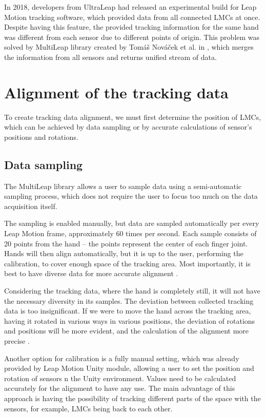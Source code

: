 
In 2018, developers from UltraLeap had released an experimental build for Leap Motion tracking software, which provided data from all connected LMCs at once. Despite having this feature, the provided tracking information for the same hand was different from each sensor due to different points of origin. This problem was solved by MultiLeap library created by Tomáš Nováček et al. in \cite{tomasMultileap}, which merges the information from all sensors and returns unified stream of data. 

\section{Alignment of the tracking data}

To create tracking data alignment, we must first determine the position of LMCs, which can be achieved by data sampling or by accurate calculations of sensor's positions and rotations.

\subsection{Data sampling}

The MultiLeap library allows a user to sample data using a semi-automatic sampling process, which does not require the user to focus too much on the data acquisition itself.

The sampling is enabled manually, but data are sampled automatically per every Leap Motion frame, approximately 60 times per second. Each sample consists of 20 points from the hand – the points represent the center of each finger joint. Hands will then align automatically, but it is up to the user, performing the calibration, to cover enough space of the tracking area. Most importantly, it is best to have diverse data for more accurate alignment \cite{tomasMultileap}.

Considering the tracking data, where the hand is completely still, it will not have the necessary diversity in its samples. The deviation between collected tracking data is too insignificant. If we were to move the hand across the tracking area, having it rotated in various ways in various positions, the deviation of rotations and positions will be more evident, and the calculation of the alignment more precise \cite{tomasMultileap}.

Another option for calibration is a fully manual setting, which was already provided by Leap Motion Unity module, allowing a user to set the position and rotation of sensors n the Unity environment. Values need to be calculated accurately for the alignment to have any use. The main advantage of this approach is having the possibility of tracking different parts of the space with the sensors, for example, LMCs being back to each other.

